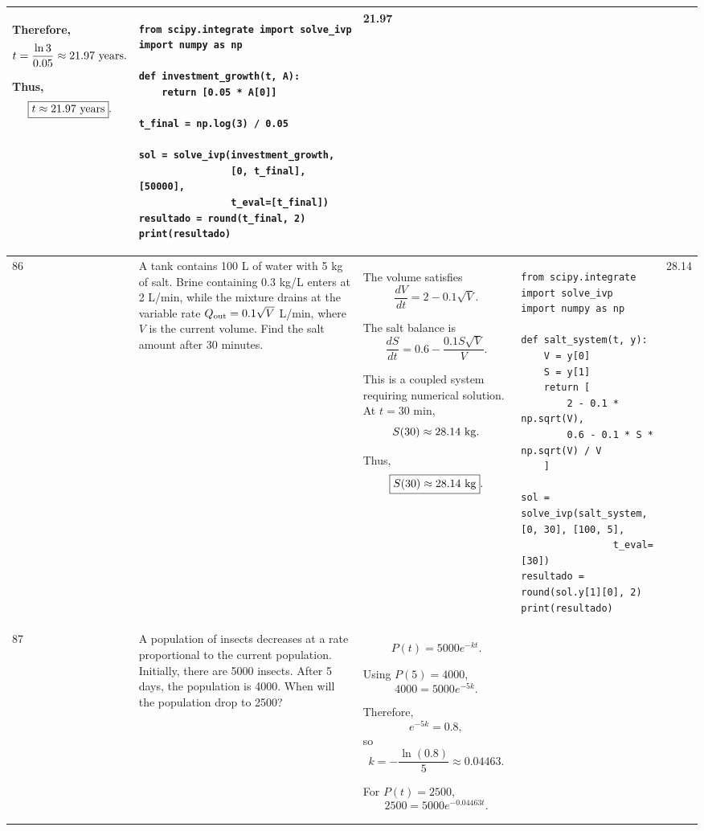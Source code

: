 \documentclass[a4paper,12pt]{article}
\begin{document}
\begin{longtable}{|p{0.3cm}|p{}|p{10cm}|p{}|p{1.5cm}|}
Therefore,
\[
t=\frac{\ln3}{0.05}
\approx21.97\ {\rm years}.
\]

Thus,
\[
\boxed{t\approx21.97\ {\rm years}}.
\]
&
\begin{verbatim}
from scipy.integrate import solve_ivp
import numpy as np

def investment_growth(t, A):
    return [0.05 * A[0]]

t_final = np.log(3) / 0.05

sol = solve_ivp(investment_growth,
                [0, t_final], [50000],
                t_eval=[t_final])
resultado = round(t_final, 2)
print(resultado)
\end{verbatim}
&
21.97 \\
\hline

86 &
A tank contains 100 L of water with 5 kg of salt. Brine containing $0.3$ kg/L enters at 2 L/min, while the mixture drains at the variable rate $Q_{\rm out}=0.1\sqrt{V}$ L/min, where $V$ is the current volume. Find the salt amount after 30 minutes. &
The volume satisfies
\[
\frac{dV}{dt}
=2-0.1\sqrt{V}.
\]

The salt balance is
\[
\frac{dS}{dt}
=0.6-\frac{0.1S\sqrt{V}}{V}.
\]

This is a coupled system requiring numerical solution. At $t=30$ min,
\[
S(30)\approx28.14\ {\rm kg}.
\]

Thus,
\[
\boxed{S(30)\approx28.14\ {\rm kg}}.
\]
&
\begin{verbatim}
from scipy.integrate import solve_ivp
import numpy as np

def salt_system(t, y):
    V = y[0]
    S = y[1]
    return [
        2 - 0.1 * np.sqrt(V),
        0.6 - 0.1 * S * np.sqrt(V) / V
    ]

sol = solve_ivp(salt_system, [0, 30], [100, 5],
                t_eval=[30])
resultado = round(sol.y[1][0], 2)
print(resultado)
\end{verbatim}
&
28.14 \\
\hline

87 &
A population of insects decreases at a rate proportional to the current population. Initially, there are 5000 insects. After 5 days, the population is 4000. When will the population drop to 2500? &
\[
P(t)=5000e^{-kt}.
\]

Using $P(5)=4000$,
\[
4000=5000e^{-5k}.
\]

Therefore,
\[
e^{-5k}=0.8,
\]
so
\[
k=-\frac{\ln(0.8)}{5}
\approx0.04463.
\]

For $P(t)=2500$,
\[
2500=5000e^{-0.04463t}.
\]


\end{longtable}
\end{document}
